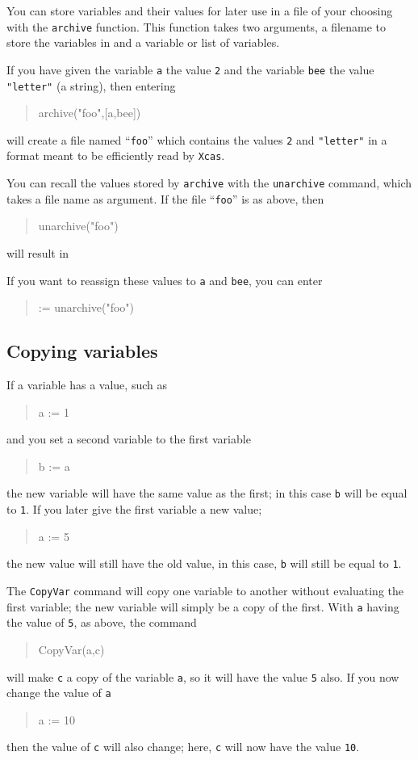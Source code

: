 \documentclass[a4paper,11pt]{book}
\newenvironment{giaccmd}
{\begin{quote}\ttfamily}
{\end{quote}}
\begin{document}
You can store variables and their values for later use in a file of
your choosing with the \texttt{archive} function.  This
function takes two arguments, a filename to store the variables in and
a variable or list of variables.

If you have given the variable \texttt{a} the value \texttt{2} and the
variable \texttt{bee} the value \texttt{"letter"} (a string), then
entering
\begin{giaccmd}
  archive("foo",[a,bee])
\end{giaccmd}
will create a file named ``\texttt{foo}'' which contains the values
\texttt{2} and \texttt{"letter"} in a format meant to be efficiently
read by \texttt{Xcas}.

You can recall the values stored by \texttt{archive} with the
\texttt{unarchive} command, which takes a file name
as argument.  If the file ``\texttt{foo}'' is as above, then 
\begin{giaccmd}
  unarchive("foo")
\end{giaccmd}
will result in
\begin{giaccmd}
  [2, letter]
\end{giaccmd}
If you want to reassign these values to \texttt{a} and \texttt{bee},
you can enter
\begin{giaccmd}
  [a,bee] := unarchive("foo")
\end{giaccmd}

\subsection{Copying variables}

If a variable has a value, such as
\begin{giaccmd}
  a := 1
\end{giaccmd}
and you set a second variable to the first variable
\begin{giaccmd}
  b := a
\end{giaccmd}
the new variable will have the same value as the first; in this case
\texttt{b} will be equal to \texttt{1}.  If you later give the first
variable a new value;
\begin{giaccmd}
  a := 5
\end{giaccmd}
the new value will still have the old value, in this case, \texttt{b}
will still be equal to \texttt{1}.

The \texttt{CopyVar} command will copy one variable to
another without evaluating the first variable; the new variable will
simply be a copy of the first.  With \texttt{a} having the value of
\texttt{5}, as above, the command
\begin{giaccmd}
  CopyVar(a,c)
\end{giaccmd}
will make \texttt{c} a copy of the variable \texttt{a}, so it will
have the value \texttt{5} also.  If you now change the value of
\texttt{a}
\begin{giaccmd}
  a := 10
\end{giaccmd}
then the value of \texttt{c} will also change; here, \texttt{c} will
now have the value \texttt{10}.
\end{document}
